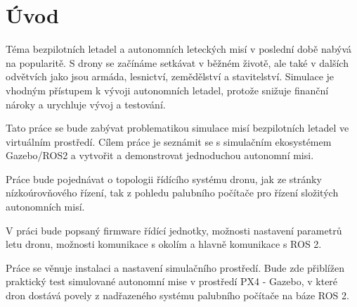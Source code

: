 \chapter*{Úvod}
{}

Téma bezpilotních letadel a autonomních leteckých misí v poslední době nabývá na popularitě. S drony se začínáme setkávat v běžném životě, ale také v dalších odvětvích jako jsou armáda, lesnictví, zemědělství a stavitelství. Simulace je vhodným přístupem k vývoji autonomních letadel, protože snižuje finanční nároky a urychluje vývoj a testování.

Tato práce se bude zabývat problematikou simulace misí bezpilotních letadel ve virtuálním prostředí. Cílem práce je seznámit se s simulačním ekosystémem Gazebo/ROS2 a vytvořit a demonstrovat jednoduchou autonomní misi.

Práce bude pojednávat o topologii řídícího systému dronu, jak ze stránky nízkoúrovňového řízení, tak z pohledu palubního počítače pro řízení složitých autonomních misí.

V práci bude popsaný firmware řídící jednotky, možnosti nastavení parametrů letu dronu, možnosti komunikace s okolím a hlavně komunikace s ROS 2.

Práce se věnuje instalaci a nastavení simulačního prostředí. Bude zde přiblížen praktický test simulované autonomní mise v prostředí PX4 - Gazebo, v které dron dostává povely z nadřazeného systému palubního počítače na báze ROS 2.